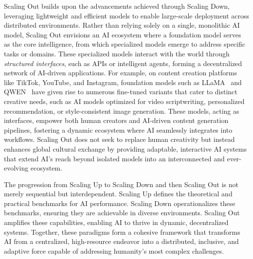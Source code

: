 Scaling Out builds upon the advancements achieved through Scaling Down, leveraging lightweight and efficient models to enable large-scale deployment across distributed environments. Rather than relying solely on a single, monolithic AI model, Scaling Out envisions an AI ecosystem where a foundation model serves as the core intelligence, from which specialized models emerge to address specific tasks or domains. These specialized models interact with the world through \emph{structured interfaces}, such as APIs or intelligent agents, forming a decentralized network of AI-driven applications. For example, on content creation platforms like TikTok, YouTube, and Instagram, foundation models such as LLaMA~\cite{touvron2023llama} and QWEN~\cite{yang2024qwen2} have given rise to numerous fine-tuned variants that cater to distinct creative needs, such as AI models optimized for video scriptwriting, personalized recommendation, or style-consistent image generation. These models, acting as interfaces, empower both human creators and AI-driven content generation pipelines, fostering a dynamic ecosystem where AI seamlessly integrates into workflows. Scaling Out does not seek to replace human creativity but instead enhances global cultural exchange by providing adaptable, interactive AI systems that extend AI’s reach beyond isolated models into an interconnected and ever-evolving ecosystem.

The progression from Scaling Up to Scaling Down and then Scaling Out is not merely sequential but interdependent. Scaling Up defines the theoretical and practical benchmarks for AI performance. Scaling Down operationalizes these benchmarks, ensuring they are achievable in diverse environments. Scaling Out amplifies these capabilities, enabling AI to thrive in dynamic, decentralized systems. Together, these paradigms form a cohesive framework that transforms AI from a centralized, high-resource endeavor into a distributed, inclusive, and adaptive force capable of addressing humanity's most complex challenges. 